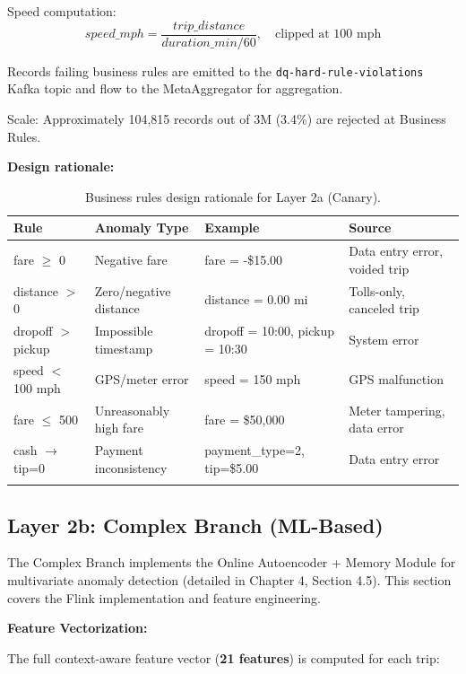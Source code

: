 Speed computation:
\begin{equation}
speed\_mph = \frac{trip\_distance}{duration\_min / 60}, \quad \text{clipped at 100 mph}
\end{equation}

Records failing business rules are emitted to the \texttt{dq-hard-rule-violations} Kafka topic and flow to the MetaAggregator for aggregation.

Scale: Approximately 104,815 records out of 3M (3.4\%) are rejected at Business Rules.

\textbf{Design rationale:}

\begin{longtable}{|m{2.5cm}|m{3.5cm}|m{4cm}|m{3.5cm}|}
\hline
\textbf{Rule} & \textbf{Anomaly Type} & \textbf{Example} & \textbf{Source} \\ \hline
fare $\geq$ 0 & Negative fare & fare = -\$15.00 & Data entry error, voided trip \\ \hline
distance $>$ 0 & Zero/negative distance & distance = 0.00 mi & Tolls-only, canceled trip \\ \hline
dropoff $>$ pickup & Impossible timestamp & dropoff = 10:00, pickup = 10:30 & System error \\ \hline
speed $<$ 100 mph & GPS/meter error & speed = 150 mph & GPS malfunction \\ \hline
fare $\leq$ 500 & Unreasonably high fare & fare = \$50,000 & Meter tampering, data error \\ \hline
cash $\to$ tip=0 & Payment inconsistency & payment\_type=2, tip=\$5.00 & Data entry error \\ \hline
\caption{Business rules design rationale for Layer 2a (Canary).}
\label{tab:business_rules_design}
\end{longtable}

\subsection{Layer 2b: Complex Branch (ML-Based)}

The Complex Branch implements the Online Autoencoder + Memory Module for multivariate anomaly detection (detailed in Chapter 4, Section 4.5). This section covers the Flink implementation and feature engineering.

\textbf{Feature Vectorization:}

The full context-aware feature vector (\textbf{21 features}) is computed for each trip:

